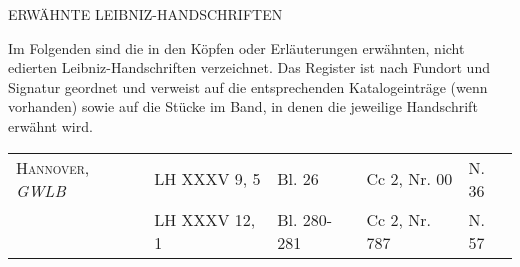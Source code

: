%
% 
\vspace{4.0ex}%
%
\begin{center} \uppercase{Erwähnte Leibniz-Handschriften}\end{center}
%
Im Folgenden sind die in den Köpfen oder Erläuterungen erwähnten, nicht edierten Leibniz-Handschriften verzeichnet.
Das Register ist nach Fundort und Signatur geordnet und verweist auf die entsprechenden Katalogeinträge (wenn vorhanden) sowie auf die Stücke im Band, in denen die jeweilige Handschrift erwähnt wird.
%
\\[4.0ex]%
\begin{tabular}{lllll}
\textsc{Hannover}, \textit{GWLB} & LH XXXV 9, 5 & Bl. 26 & Cc 2, Nr. 00 & N. 36\\%
 & LH XXXV 12, 1 & Bl. 280-281 & Cc 2, Nr. 787 & N. 57%
\end{tabular}
\clearpage
